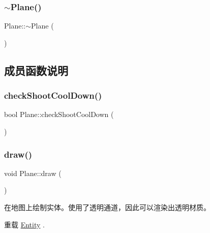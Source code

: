 \subsubsection{\texorpdfstring{$\sim$\+Plane()}{~Plane()}}
{\footnotesize\ttfamily Plane\+::$\sim$\+Plane (\begin{DoxyParamCaption}{ }\end{DoxyParamCaption})}



\subsection{成员函数说明}
\mbox{\label{class_plane_a77bd3df33921e215669be6583619ee45}} 
\subsubsection{\texorpdfstring{check\+Shoot\+Cool\+Down()}{checkShootCoolDown()}}
{\footnotesize\ttfamily bool Plane\+::check\+Shoot\+Cool\+Down (\begin{DoxyParamCaption}{ }\end{DoxyParamCaption})\hspace{0.3cm}{\ttfamily [protected]}}

\mbox{\label{class_plane_a8877358878e91929c4c01bad40cbdb78}} 
\subsubsection{\texorpdfstring{draw()}{draw()}}
{\footnotesize\ttfamily void Plane\+::draw (\begin{DoxyParamCaption}{ }\end{DoxyParamCaption})\hspace{0.3cm}{\ttfamily [virtual]}}



在地图上绘制实体。使用了透明通道，因此可以渲染出透明材质。 



重载 \hyperlink{class_entity_a7666f416dd0d1fce0f1133f78df44476}{Entity} .

\mbox{\label{class_plane_ad63d1e65ff9ca0d8b0ea1f6d37c55388}} 
